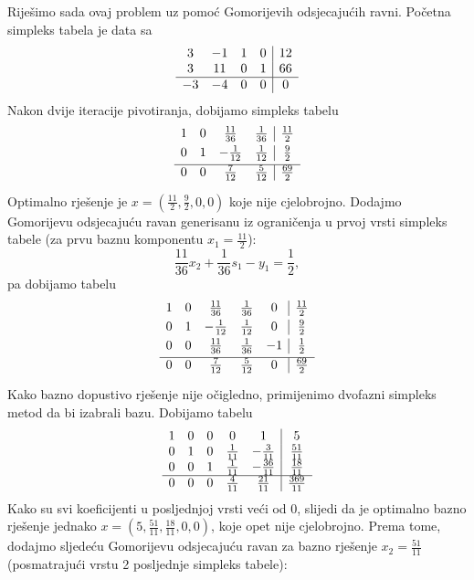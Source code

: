 \documentclass[a4paper, utf8, 11pt, colorlinks]{book}
\theoremstyle{definition}
\begin{document}
Riješimo sada ovaj problem uz pomoć Gomorijevih odsjecajućih ravni. 
Početna simpleks tabela je data sa 
$$\begin{array}{ccc c| c}
    3  & -1 & 1 &  0  & 12  \\
    3  & 11 & 0 &  1  & 66 \\ \hline
   -3  & -4 & 0 &  0  & 0
\end{array}$$
Nakon dvije iteracije pivotiranja, dobijamo simpleks tabelu 
$$\begin{array}{ccc c| c}\vspace{1mm}
1 & 0 &  \frac{11}{36}   &  \frac{1}{36}  &  \frac{11}{2} \\\vspace{1mm}
0 & 1 &  -\frac{1}{12}  &  \frac{1}{12}  &  \frac{9}{2}   \\ \hline\vspace{1mm}
0 & 0 &  \frac{7}{12}   &  \frac{5}{12}  &  \frac{69}{2}
\end{array} $$
Optimalno rješenje je $x = (\frac{11}{2}, \frac{9}{2}, 0, 0)$ koje nije cjelobrojno. Dodajmo Gomorijevu odsjecajuću ravan generisanu iz ograničenja u prvoj vrsti simpleks tabele (za prvu baznu komponentu $x_1 = \frac{11}{2}$):
$$  \frac{11}{36} x_2 + \frac{1}{36} s_1 - y_1 = \frac{1}{2},$$
pa dobijamo tabelu 
$$\begin{array}{ccccc| c}\vspace{1mm}
1 &  0 &   \frac{11}{36}  & \frac{1}{36}   &  0 & \frac{11}{2} \\\vspace{1mm}
0 &  1 &   -\frac{1}{12}  & \frac{1}{12}   &  0 & \frac{9}{2} \\\vspace{1mm}
0 &  0 &  \frac{11}{36}   &  \frac{1}{36}  & -1 & \frac{1}{2} \\ \hline\vspace{1mm}
0 & 0  &  \frac{7}{12}    & \frac{5}{12}   &  0 & \frac{69}{2}
\end{array} $$
Kako bazno dopustivo rješenje nije očigledno, primijenimo dvofazni simpleks metod da bi izabrali bazu. Dobijamo tabelu
$$\begin{array}{ccccc| c}
1   &   0       &   0   &   0             & 1              & 5 \\
0   &   1       &   0   &   \frac{1}{11}  & -\frac{3}{11}  & \frac{51}{11} \\
0   &   0       &   1   &   \frac{1}{11}  & -\frac{36}{11} &  \frac{18}{11} \\ \hline
0   &   0       &   0   &   \frac{4}{11}  & \frac{21}{11}  &  \frac{369}{11} \\
\end{array} $$
Kako su svi koeficijenti u posljednjoj vrsti veći od 0, slijedi da je optimalno bazno rješenje jednako $x=(5, \frac{51}{11}, \frac{18}{11}, 0, 0)$, koje opet nije cjelobrojno. 
 Prema tome, dodajmo sljedeću Gomorijevu odsjecajuću ravan za bazno rješenje $x_2 = \frac{51}{11}$ (posmatrajući vrstu 2 posljednje simpleks tabele):
 
\end{document}
